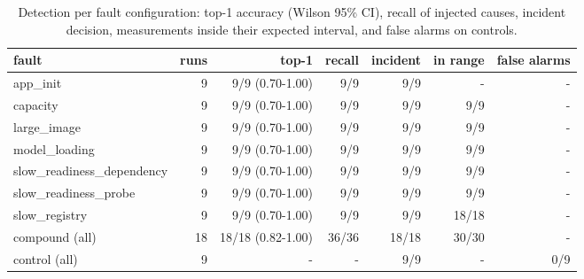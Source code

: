 \begin{table}[t]
\centering\small
\caption{Detection per fault configuration: top-1 accuracy (Wilson 95\% CI), recall of injected causes, incident decision, measurements inside their expected interval, and false alarms on controls.}\label{tab:rq1_detection}
\begin{tabular}{lrrrrrr}
\toprule
fault & runs & top-1 & recall & incident & in range & false alarms \\
\midrule
app\_init & 9 & 9/9 (0.70-1.00) & 9/9 & 9/9 & - & - \\
capacity & 9 & 9/9 (0.70-1.00) & 9/9 & 9/9 & 9/9 & - \\
large\_image & 9 & 9/9 (0.70-1.00) & 9/9 & 9/9 & 9/9 & - \\
model\_loading & 9 & 9/9 (0.70-1.00) & 9/9 & 9/9 & 9/9 & - \\
slow\_readiness\_dependency & 9 & 9/9 (0.70-1.00) & 9/9 & 9/9 & 9/9 & - \\
slow\_readiness\_probe & 9 & 9/9 (0.70-1.00) & 9/9 & 9/9 & 9/9 & - \\
slow\_registry & 9 & 9/9 (0.70-1.00) & 9/9 & 9/9 & 18/18 & - \\
compound (all) & 18 & 18/18 (0.82-1.00) & 36/36 & 18/18 & 30/30 & - \\
control (all) & 9 & - & - & 9/9 & - & 0/9 \\
\bottomrule
\end{tabular}
\end{table}
